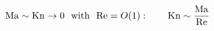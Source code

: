 \documentclass[preview]{standalone}
\begin{document}
\begin{align*}
\special{dvisvgm:raw <g id='unique000'>}\mathrm{Ma}\sim\mathrm{Kn}\to0\ \ \text{with}\ \ \mathrm{Re}=O(1):\qquad \mathrm{Kn}\sim\frac{\mathrm{Ma}}{\mathrm{Re}}\special{dvisvgm:raw </g>}
\end{align*}
\end{document}
